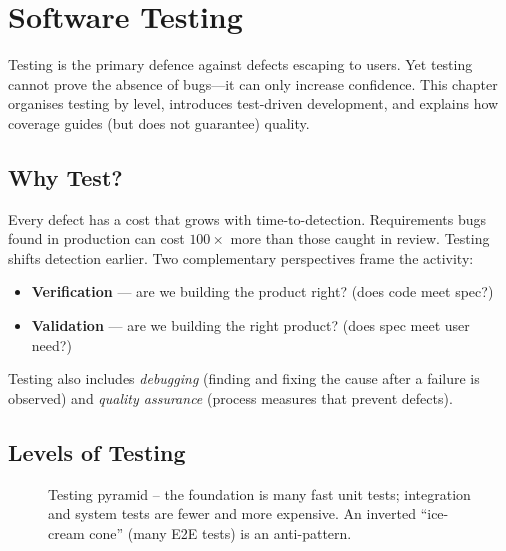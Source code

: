 \chapter{Software Testing}
\label{ch:testing}

Testing is the primary defence against defects escaping to users. Yet testing cannot prove the absence of bugs---it can only increase confidence. This chapter organises testing by level, introduces test-driven development, and explains how coverage guides (but does not guarantee) quality.

\section{Why Test?}

Every defect has a cost that grows with time-to-detection. Requirements bugs found in production can cost $100\times$ more than those caught in review. Testing shifts detection earlier. Two complementary perspectives frame the activity:

\begin{itemize}
    \item \textbf{Verification} --- are we building the product right? (does code meet spec?)
    \item \textbf{Validation} --- are we building the right product? (does spec meet user need?)
\end{itemize}

Testing also includes \emph{debugging} (finding and fixing the cause after a failure is observed) and \emph{quality assurance} (process measures that prevent defects).

\section{Levels of Testing}

\begin{figure}[h]
\centering
{}
\caption{Testing pyramid -- the foundation is many fast unit tests; integration and system tests are fewer and more expensive. An inverted ``ice-cream cone'' (many E2E tests) is an anti-pattern.}
\end{figure}

